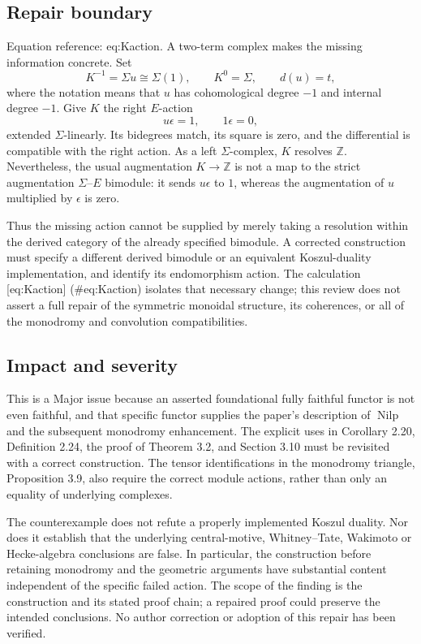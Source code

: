 \documentclass[10pt]{article}
\begin{document}
\subsection*{Repair boundary}
Equation reference: eq:Kaction. A two-term complex makes the missing information concrete. Set \[K^{-1}=\Sigma u\cong\Sigma(1),\qquad K^0=\Sigma,\qquad d(u)=t,\] where the notation means that \(u\) has cohomological degree \(-1\) and internal degree \(-1\). Give \(K\) the right \(E\)-action \[
 u\epsilon=1,\qquad 1\epsilon=0,\] extended \(\Sigma\)-linearly. Its bidegrees match, its square is zero, and the differential is compatible with the right action. As a left \(\Sigma\)-complex, \(K\) resolves \(\mathbb Z\). Nevertheless, the usual augmentation \(K\to\mathbb Z\) is not a map to the strict augmentation \(\Sigma\)–\(E\) bimodule: it sends \(u\epsilon\) to \(1\), whereas the augmentation of \(u\) multiplied by \(\epsilon\) is zero.\par
Thus the missing action cannot be supplied by merely taking a resolution within the derived category of the already specified bimodule. A corrected construction must specify a different derived bimodule or an equivalent Koszul-duality implementation, and identify its endomorphism action. The calculation [eq:Kaction] (\#eq:Kaction) isolates that necessary change; this review does not assert a full repair of the symmetric monoidal structure, its coherences, or all of the monodromy and convolution compatibilities.\par
\subsection*{Impact and severity}
This is a Major issue because an asserted foundational fully faithful functor is not even faithful, and that specific functor supplies the paper’s description of \(\operatorname{Nilp}\) and the subsequent monodromy enhancement. The explicit uses in Corollary 2.20, Definition 2.24, the proof of Theorem 3.2, and Section 3.10 must be revisited with a correct construction. The tensor identifications in the monodromy triangle, Proposition 3.9, also require the correct module actions, rather than only an equality of underlying complexes.\par
The counterexample does not refute a properly implemented Koszul duality. Nor does it establish that the underlying central-motive, Whitney–Tate, Wakimoto or Hecke-algebra conclusions are false. In particular, the construction before retaining monodromy and the geometric arguments have substantial content independent of the specific failed action. The scope of the finding is the construction and its stated proof chain; a repaired proof could preserve the intended conclusions. No author correction or adoption of this repair has been verified.\par
\end{document}
